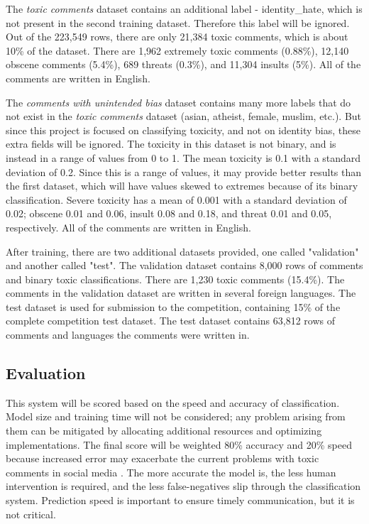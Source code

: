 \documentclass{article}
\begin{document}
The \textit{toxic comments} dataset contains an additional label - identity\_hate, which is not present in the second training dataset. Therefore this label will be ignored. Out of the 223,549 rows, there are only 21,384 toxic comments, which is about 10\% of the dataset. There are 1,962 extremely toxic comments (0.88\%), 12,140 obscene comments (5.4\%), 689 threats (0.3\%), and 11,304 insults (5\%). All of the comments are written in English.

The \textit{comments with unintended bias} dataset contains many more labels that do not exist in the \textit{toxic comments} dataset (asian, atheist, female, muslim, etc.). But since this project is focused on classifying toxicity, and not on identity bias, these extra fields will be ignored. The toxicity in this dataset is not binary, and is instead in a range of values from 0 to 1. The mean toxicity is 0.1 with a standard deviation of 0.2. Since this is a range of values, it may provide better results than the first dataset, which will have values skewed to extremes because of its binary classification. Severe toxicity has a mean of 0.001 with a standard deviation of 0.02; obscene 0.01 and 0.06, insult 0.08 and 0.18, and threat 0.01 and 0.05, respectively. All of the comments are written in English.

After training, there are two additional datasets provided, one called "validation" and another called "test". The validation dataset contains 8,000 rows of comments and binary toxic classifications. There are 1,230 toxic comments (15.4\%). The comments in the validation dataset are written in several foreign languages. The test dataset is used for submission to the competition, containing 15\% of the complete competition test dataset. The test dataset contains 63,812 rows of comments and languages the comments were written in.

\subsection{Evaluation}

This system will be scored based on the speed and accuracy of classification. Model size and training time will not be considered; any problem arising from them can be mitigated by allocating additional resources and optimizing implementations. The final score will be weighted 80\% accuracy and 20\% speed because increased error may exacerbate the current problems with toxic comments in social media \cite{10.1145/3200947.3208069}. The more accurate the model is, the less human intervention is required, and the less false-negatives slip through the classification system. Prediction speed is important to ensure timely communication, but it is not critical.
\end{document}
